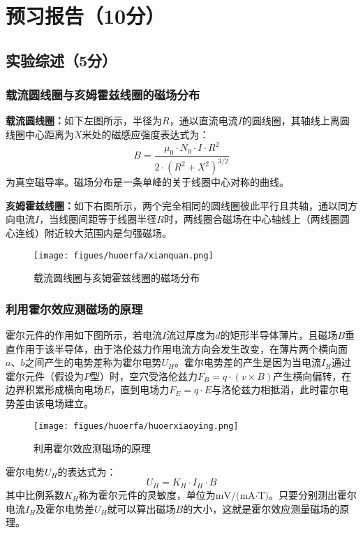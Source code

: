 \documentclass[]{../template/Report}%
\begin{document}
\makecover%
\section{预习报告（10分）}
\subsection{实验综述（5分）}
\subsubsection{载流圆线圈与亥姆霍兹线圈的磁场分布}
\textbf{载流圆线圈：}如下左图所示，半径为$R$，通以直流电流$I$的圆线圈，其轴线上离圆线圈中心距离为$X$米处的磁感应强度表达式为：
\[B = \frac{\mu_0 \cdot N_0 \cdot I \cdot R^2}{2 \cdot (R^2 + X^2)^{3/2}}\]为真空磁导率。磁场分布是一条单峰的关于线圈中心对称的曲线。

\vspace{2mm}
\textbf{亥姆霍兹线圈：}如下右图所示，两个完全相同的圆线圈彼此平行且共轴，通以同方向电流$I$，当线圈间距等于线圈半径$R$时，两线圈合磁场在中心轴线上（两线圈圆心连线）附近较大范围内是匀强磁场。
\begin{figure}[!h]
    \begin{center}
        \texttt{[image: figues/huoerfa/xianquan.png]}
        \caption{载流圆线圈与亥姆霍兹线圈的磁场分布}
    \end{center}
\end{figure}
\vspace{-7mm}
\subsubsection{利用霍尔效应测磁场的原理}
霍尔元件的作用如下图所示，若电流$I$流过厚度为$d$的矩形半导体薄片，且磁场$B$垂直作用于该半导体，由于洛伦兹力作用电流方向会发生改变，在薄片两个横向面$a、b$之间产生的电势差称为霍尔电势\(U_H\)。霍尔电势差的产生是因为当电流\(I_H\)通过霍尔元件（假设为$P$型）时，空穴受洛伦兹力\(F_B = q \cdot (v \times B)\)产生横向偏转，在边界积累形成横向电场$E$，直到电场力\(F_E = q \cdot E\)与洛伦兹力相抵消，此时霍尔电势差由该电场建立。
\begin{figure}[!h]
    \begin{center}
        \texttt{[image: figues/huoerfa/huoerxiaoying.png]}
        \caption{利用霍尔效应测磁场的原理}
    \end{center}
\end{figure}

霍尔电势\(U_H\)的表达式为：
\[U_H = K_H \cdot I_H \cdot B\]
其中比例系数\(K_H\)称为霍尔元件的灵敏度，单位为\(\text{mV/(mA·T)}\)。只要分别测出霍尔电流\(I_H\)及霍尔电势差\(U_H\)就可以算出磁场$B$的大小，这就是霍尔效应测量磁场的原理。
\end{document}
